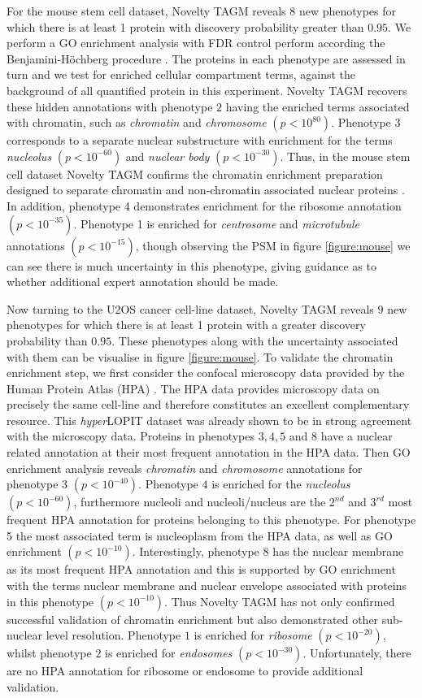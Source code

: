 \documentclass[12pt,english]{article}
\begin{document}
For the mouse stem cell dataset, Novelty TAGM reveals $8$ new phenotypes for which there is at least 1 protein with discovery probability greater than $0.95$. We perform a GO enrichment analysis with FDR control perform according the Benjamini-H\"ochberg procedure \citep{FDR:1995,Ashburner:2000,Yu:2012}. The proteins in each phenotype are assessed in turn and we test for enriched cellular compartment terms, against the background of all quantified protein in this experiment. Novelty TAGM recovers these hidden annotations with phenotype $2$ having the enriched terms associated with chromatin, such as \textit{chromatin} and \textit{chromosome} $(p < 10^{80})$. Phenotype 3 corresponds to a separate nuclear substructure with enrichment for the terms \textit{nucleolus} $(p < 10^{-60})$ and \textit{nuclear body} $(p < 10^{-30})$. Thus, in the mouse stem cell dataset Novelty TAGM confirms the chromatin enrichment preparation designed to separate chromatin and non-chromatin associated nuclear proteins \citep{Mulvey:2017}. In addition, phenotype 4 demonstrates enrichment for the ribosome annotation $(p < 10^{-35})$. Phenotype 1 is enriched for \textit{centrosome} and \textit{microtubule} annotations $(p < 10^{-15})$, though observing the PSM in figure \ref{figure:mouse} we can see there is much uncertainty in this phenotype, giving guidance as to whether additional expert annotation should be made.

Now turning to the U2OS cancer cell-line dataset, Novelty TAGM reveals $9$ new phenotypes for which there is at least 1 protein with a greater discovery probability than $0.95$. These phenotypes along with the uncertainty associated with them can be visualise in figure \ref{figure:mouse}. To validate the chromatin enrichment step, we first consider the confocal microscopy data provided by the Human Protein Atlas (HPA) \citep{Thul:2017}. The HPA data provides microscopy data on precisely the same cell-line and therefore constitutes an excellent complementary resource. This \textit{hyper}LOPIT dataset was already shown to be in strong agreement with the microscopy data. Proteins in phenotypes $3,4,5$ and $8$ have a nuclear related annotation at their most frequent annotation in the HPA data. Then GO enrichment analysis reveals \textit{chromatin} and \textit{chromosome} annotations for phenotype 3 $(p < 10^{-40})$. Phenotype $4$ is enriched for the \textit{nucleolus} $(p < 10^{-60})$, furthermore nucleoli and nucleoli/nucleus are the $2^{nd}$ and $3^{rd}$ most frequent HPA annotation for proteins belonging to this phenotype. For phenotype 5 the most associated term is nucleoplasm from the HPA data, as well as GO enrichment $(p < 10^{-10})$. Interestingly, phenotype $8$ has the nuclear membrane as its most frequent HPA annotation and this is supported by GO enrichment with the terms nuclear membrane and nuclear envelope associated with proteins in this phenotype $(p < 10^{-10})$. Thus Novelty TAGM has not only confirmed successful validation of chromatin enrichment but also demonstrated other sub-nuclear level resolution. Phenotype $1$ is enriched for \textit{ribosome} $( p < 10^{-20})$, whilst phenotype $2$ is enriched for \textit{endosomes} $(p < 10^{-30})$. Unfortunately, there are no HPA annotation for ribosome or endosome to provide additional validation.
\end{document}
